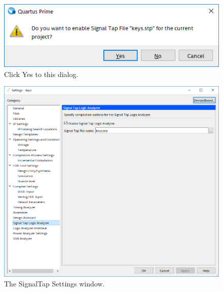 \documentclass[11pt, twoside, pdftex]{article}
\begin{document}
\begin{enumerate}
\begin{figure}[H]
   \begin{center}
      \includegraphics[scale=0.65]{figures/figure6.png}
   \caption{Click {\sf Yes} to this dialog.} 
	 \label{fig:6}
	 \end{center}
\end{figure}

\begin{figure}[H]
   \begin{center}
      \includegraphics[scale=0.65]{figures/figure7.png}
   \caption{The SignalTap Settings window.} 
	 \label{fig:7}
	 \end{center}
\end{figure}


\end{enumerate}
\end{document}
